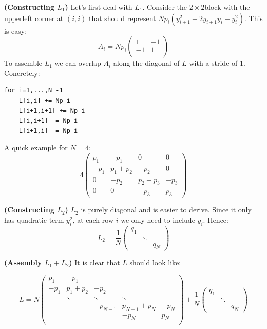 \textbf{(Constructing $L_1$)}
Let's first deal with $L_1$. Consider the $2\times 2$block with the upperleft corner at $(i,i)$ that should
represent $Np_i(y_{i+1}^2 -2y_{i+1}y_i +y_i^2)$. This is easy:
\begin{equation}
A_i=Np_i\begin{pmatrix}
1 & -1\\
-1 & 1 \\
\end{pmatrix}
\end{equation}
To assemble $L_1$ we can overlap $A_i$ along the diagonal of $L$ with a stride of 1. Concretely:

\begin{verbatim}
for i=1,...,N -1
    L[i,i] += Np_i
    L[i+1,i+1] += Np_i
    L[i,i+1] -= Np_i 
    L[i+1,i] -= Np_i
\end{verbatim}

\begin{example}A quick example for $N=4$:
\begin{equation}
4\begin{pmatrix}
p_1 & -p_1 & 0 & 0 \\
-p_1 & p_1+p_2 & -p_2 &0 \\
0 & -p_2 & p_2+p_3 & -p_3 \\
0 &  0 & -p_3  & p_3
\end{pmatrix}
\end{equation}

\end{example}\textbf{(Constructing $L_2$)}
$L_2$ is purely diagonal and is easier to derive. Since it only has quadratic term $y_i^2$, at each row $i$ we only need to include $y_i$. Hence:
\begin{equation}
L_2 = \frac{1}{N}\begin{pmatrix}q_1 & & \\
& \ddots & \\
& & q_N
\end{pmatrix}
\end{equation}

\textbf{(Assembly $L_1+L_2$)}
It is clear that $L$ should look like:

\begin{equation}
L=N\begin{pmatrix}
p_1&  -p_1 & & &  \\
-p_1& p_1+p_2 &  -p_2 & &  \\
&  \ddots  &  \ddots &   \ddots &   \\
&  &-p_{N-1} &p_{N-1}+p_{N} & -p_N  \\
& & &-p_N & p_N \\
\end{pmatrix} 
+ 
\frac{1}{N}\begin{pmatrix}q_1 & & \\
& \ddots & \\
& & q_N
\end{pmatrix}
\end{equation}

